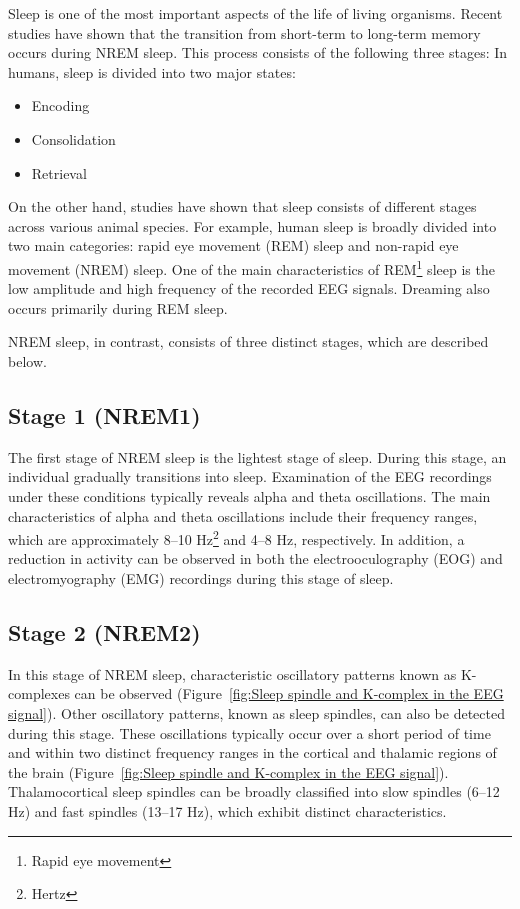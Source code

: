 \documentclass[12pt]{report}
\begin{document}
	Sleep is one of the most important aspects of the life of living organisms. Recent studies have shown that the transition from short-term to long-term memory occurs during NREM sleep\cite{Ghorbani2020}. This process consists of the following three stages:
	In humans, sleep is divided into two major states:
	\begin{itemize}
		\item Encoding
		\item Consolidation
		\item Retrieval
	\end{itemize}
	On the other hand, studies have shown that sleep consists of different stages across various animal species. For example, human sleep is broadly divided into two main categories: rapid eye movement (REM) sleep and non-rapid eye movement (NREM) sleep. One of the main characteristics of REM\footnote{Rapid eye movement} sleep is the low amplitude and high frequency of the recorded EEG signals\cite{Marshall2020}\cite{Watson2016}. Dreaming also occurs primarily during REM sleep\cite{Bandarabadi2020}.
	
	NREM sleep, in contrast, consists of three distinct stages, which are described below.
	
	\subsection{Stage 1 (NREM1)}
	\label{sec:Stage_1_(NREM1)}
	The first stage of NREM sleep is the lightest stage of sleep. During this stage, an individual gradually transitions into sleep. Examination of the EEG recordings under these conditions typically reveals alpha and theta oscillations\cite{Ghorbani2020}. The main characteristics of alpha and theta oscillations include their frequency ranges, which are approximately 8–10 Hz\footnote{Hertz} and 4–8 Hz, respectively. In addition, a reduction in activity can be observed in both the electrooculography (EOG) and electromyography (EMG) recordings during this stage of sleep.
	
	
	\subsection{Stage 2 (NREM2)}
	\label{sec:Stage_2_(NREM2)}
	In this stage of NREM sleep, characteristic oscillatory patterns known as K-complexes can be observed (Figure~\ref{fig:Sleep spindle and K-complex in the EEG signal}). Other oscillatory patterns, known as sleep spindles, can also be detected during this stage. These oscillations typically occur over a short period of time and within two distinct frequency ranges in the cortical and thalamic regions of the brain (Figure~\ref{fig:Sleep spindle and K-complex in the EEG signal})\cite{Sato2022}. Thalamocortical sleep spindles can be broadly classified into slow spindles (6–12 Hz) and fast spindles (13–17 Hz), which exhibit distinct characteristics\cite{Hashemi2019}.
	
\end{document}
